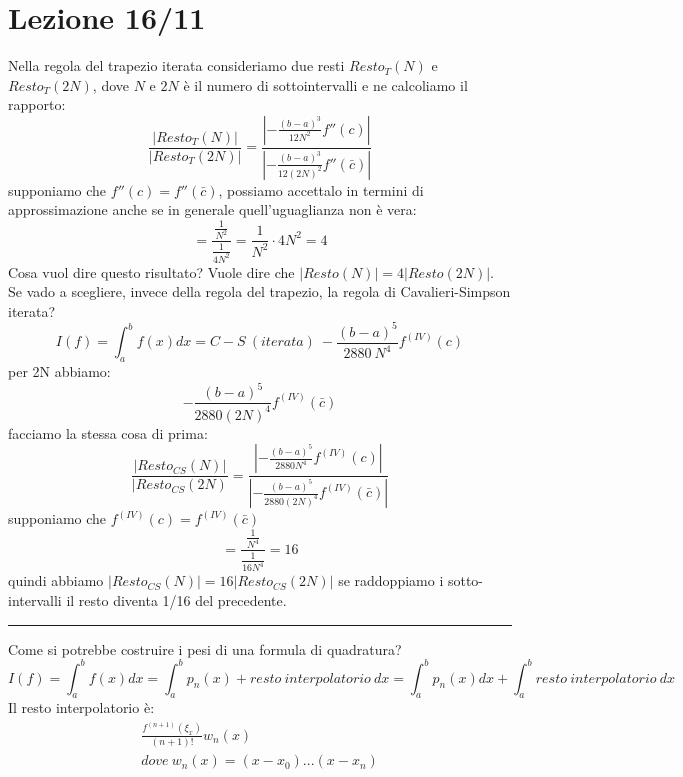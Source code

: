 \documentclass[a4paper, portrait]{book}
\numberwithin{equation}{chapter} %
\newcommand*\sepline{%
  \begin{center}
    \rule[1ex]{.5\textwidth}{.5pt}
  \end{center}}
\begin{document}
\chapter{Lezione 16/11}
Nella regola del trapezio iterata consideriamo due resti $Resto_T(N)$ e $Resto_T(2N)$, dove $N$ e $2N$ è il numero di sottointervalli e ne calcoliamo il rapporto:
\begin{equation}
    \frac{|Resto_T(N)|}{|Resto_T(2N)|} = \frac{\left|-\frac{(b-a)^3}{12 N^2}f''(c)\right|}{\left|-\frac{(b-a)^3}{12(2N)^2}f''(\bar{c})\right|}
\end{equation}
supponiamo che $f''(c) = f''(\bar{c})$, possiamo accettalo in termini di approssimazione anche se in generale quell'uguaglianza non è vera:
\begin{equation}
    = \frac{\frac{1}{N^2}}{\frac{1}{4N^2}} = \frac{1}{N^2}\cdot 4N^2 = 4
\end{equation}
Cosa vuol dire questo risultato? Vuole dire che $|Resto(N)| = 4|Resto(2N)|$.\\
Se vado a scegliere, invece della regola del trapezio, la regola di Cavalieri-Simpson iterata?
\begin{equation}
    I(f) = \int_a^b f(x) dx = C-S \ (iterata) \ - \frac{(b-a)^5}{2880 \ N^4}f^{(IV)}(c)
\end{equation}
per 2N abbiamo:
\begin{equation}
    -\frac{(b-a)^5}{2880(2N)^4}f^{(IV)}(\bar{c})
\end{equation}
facciamo la stessa cosa di prima:
\begin{equation}
    \frac{|Resto_{CS}(N)|}{|Resto_{CS}(2N)} = \frac{\left|-\frac{(b-a)^5}{2880N^4}f^{(IV)}(c)\right|}{\left|-\frac{(b-a)^5}{2880(2N)^4}f^{(IV)}(\bar{c})\right|}
\end{equation}
supponiamo che $f^{(IV)}(c) = f^{(IV)}(\bar{c})$
\begin{equation}
    = \frac{\frac{1}{N^4}}{\frac{1}{16N^4}} = 16
\end{equation}
quindi abbiamo $|Resto_{CS}(N)| = 16|Resto_{CS}(2N)|$ se raddoppiamo i sotto-intervalli il resto diventa 1/16 del precedente.\\
\sepline{}
Come si potrebbe costruire i pesi di una formula di quadratura?
\begin{equation}
    I(f) = \int_a^b f(x) dx = \int_a^b p_n(x) + resto \ interpolatorio \ dx = \int_a^b p_n(x) dx + \int_a^b resto \ interpolatorio \ dx
\end{equation}
Il resto interpolatorio è:
\begin{gather}
    \frac{f^{(n+1)}(\xi_x)}{(n+1)!}w_n(x)\\
    dove \ w_n(x) = (x-x_0)...(x-x_n)
\end{gather}
\end{document}
